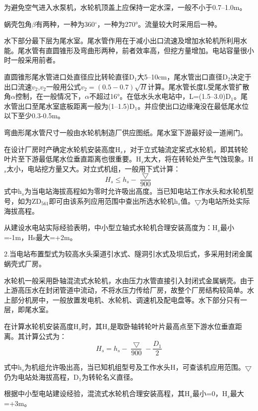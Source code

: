 \documentclass{ctexbook}
\begin{document}
为避免空气进入水泵机，水轮机顶盖上应保持一定水深，一般不小于0.7--1.0m。

蜗壳包角$\beta$有两种，一种为360$^\circ$，一种为270°。流量较大时采用后一种。

水下部分最下层为尾水室。尾水管作用在于减小出口流速及增加水轮机所利用水能。尾水管有直圆锥形及弯曲形两种，前者效率高，但挖方量增加。电站容量很小时一般采用前者。

直圆锥形尾水管进口处直径应比转轮直径D$_1$大5--10cm，尾水管出口直径D$_2$决定于出口流速$v_2$,$v_2$一般用公式$v_2=(0.5-0.7)\sqrt{H}$计算。尾水管长度L受尾水管扩散角$\alpha$控制，在一般情况下，$\alpha$不超过16°。在低水头水电站中，L=(1.5--3.0)D$_1$。尾水管出口至尾水室底板距离一般为(1--1.5)D$_1$。并应使出口边缘淹没在最低尾水位以下至少0.3-0.5m。

弯曲形尾水管尺寸一般由水轮机制造厂供应图纸。尾水室下游最好设一道闸门。

在设计厂房时产确定水轮机安装高度H$_s$，对于立式轴流定桨式水轮机，即其转轮叶片至下游最低尾水位垂直距离也很重要。H$_s$太大，将在转轮处产生气蚀现象。H$_s$太小，电站挖方量又大。对立式机组，一般用下式计算：
\begin{equation*}
	H_s \leqslant h_s -\frac{\bigtriangledown}{900}
\end{equation*}
式中h$_s$为当电站海拔高程如为零时允许吸出高度。当已知电站工作水头和水轮机型号，如为ZD$_561$即可由该系列应用范围中查出所选水轮机h$_s$值。$\bigtriangledown$为电站所处实际海拔高程。

从建设水电站实际经验表明，中小型立轴式水轮机合理安装高度为：H$_s$最小=-1m，Hs最大=+2m。

2.当电站布置型式为较高水头渠道引水式、隧洞引水式及坝后式，多采用封闭金属蜗壳式厂房。

水轮机一般采用卧轴混流式水轮机，水由压力水管直接引入封闭式金属蜗壳。由于上游高压水在封闭管道中流动，不将水压力传给厂房，故整个厂房结构较简单。水上部分机房中，一般放置发电机、水轮机、调速机及配电盘等。水下部分只有一层，即尾水室。

在计算水轮机安装高度H$_s$时，其H$_s$是取卧轴转轮叶片最高点至下游水位垂直距离。其计算公式为：
\begin{equation*}
	H_s=h_s-\frac{\bigtriangledown}{900}-\frac{D_1}{2}
\end{equation*}

式中h$_s$为机组允许吸出高，当已知机组型号及工作水头H，可查该机应用范围。$\bigtriangledown$仍为电站处海拔高程，D$_1$为转轮名义直径。

根据中小型电站建设经验，混流式水轮机合理安装高程，其H$_s$最小=0，H$_s$最大=+3m。
\end{document}
